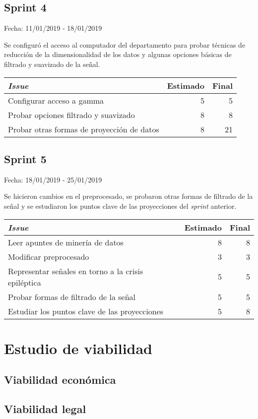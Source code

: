 \subsection{Sprint 4}

Fecha: 11/01/2019 - 18/01/2019

Se configuró el acceso al computador del departamento para probar técnicas de reducción de la dimensionalidad de los datos y algunas opciones básicas de filtrado y suavizado de la señal. 

\begin{table}[h]
	\begin{tabularx}{\textwidth}{|Xrr|}
		\hline \textbf{\textit{Issue}} & \textbf{Estimado} & \textbf{Final}\\
		\hline Configurar acceso a gamma & 5 & 5 \\
		\hline Probar opciones filtrado y suavizado & 8 & 8 \\
		\hline Probar otras formas de proyección de datos & 8 & 21 \\
		\hline
	\end{tabularx}
\end{table}

\subsection{Sprint 5}

Fecha: 18/01/2019 - 25/01/2019

Se hicieron cambios en el preprocesado, se probaron otras formas de filtrado de la señal y se estudiaron los puntos clave de las proyecciones del \textit{sprint} anterior. 

\begin{table}[h]
	\begin{tabularx}{\textwidth}{|Xrr|}
		\hline \textbf{\textit{Issue}} & \textbf{Estimado} & \textbf{Final}\\
		\hline Leer apuntes de minería de datos & 8 & 8 \\
		\hline Modificar preprocesado & 3 & 3 \\
		\hline Representar señales en torno a la crisis epiléptica & 5 & 5 \\
		\hline Probar formas de filtrado de la señal & 5 & 5 \\
		\hline Estudiar los puntos clave de las proyecciones & 5 & 8 \\
		\hline
	\end{tabularx}
\end{table}

\section{Estudio de viabilidad}

\subsection{Viabilidad económica}

\subsection{Viabilidad legal}


